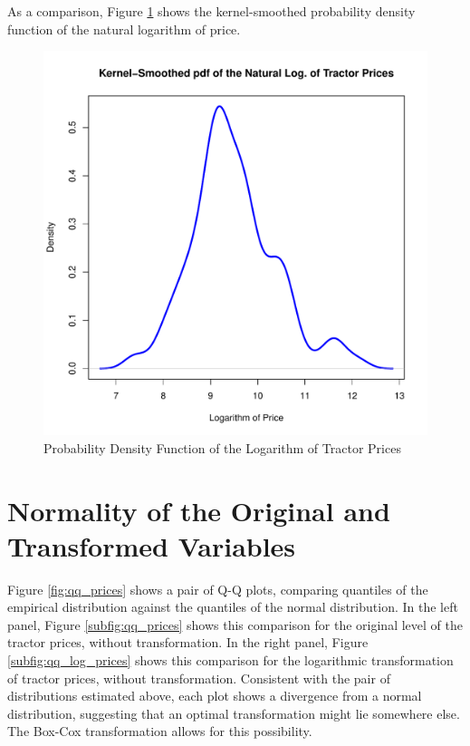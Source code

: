 \documentclass[11pt]{book}
\begin{document}
\pagebreak
As a comparison, Figure \ref{fig:density_log_prices} shows the kernel-smoothed probability density function of the natural logarithm of
price.

\begin{figure}[h!]
  \centering
  \includegraphics[scale = 0.5, keepaspectratio=true]{../Figures/density_log_prices}
  \caption{Probability Density Function of the Logarithm of Tractor Prices} \label{fig:density_log_prices}
\end{figure}




\pagebreak
\section*{Normality of the Original and Transformed Variables}

Figure \ref{fig:qq_prices} shows a pair of Q-Q plots, 
comparing quantiles of the empirical distribution against
the quantiles of the normal distribution. 
In the left panel, Figure \ref{subfig:qq_prices} shows this comparison 
for the original level of the tractor prices, without transformation. 
In the right panel, Figure \ref{subfig:qq_log_prices} shows this comparison 
for the logarithmic transformation of tractor prices, without transformation. 
Consistent with the pair of distributions estimated above, 
each plot shows a divergence from a normal distribution,
suggesting that an optimal transformation might lie somewhere else.
The Box-Cox transformation allows for this possibility. 
\end{document}
